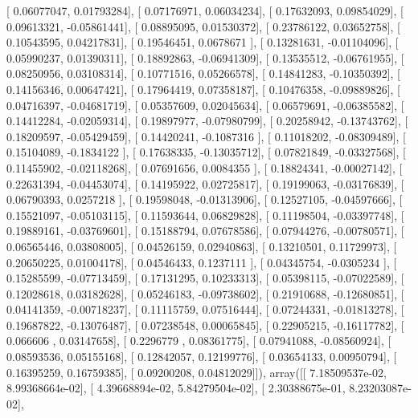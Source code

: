 \documentclass{article}
\begin{document}
       [ 0.06077047,  0.01793284],
       [ 0.07176971,  0.06034234],
       [ 0.17632093,  0.09854029],
       [ 0.09613321, -0.05861441],
       [ 0.08895095,  0.01530372],
       [ 0.23786122,  0.03652758],
       [ 0.10543595,  0.04217831],
       [ 0.19546451,  0.0678671 ],
       [ 0.13281631, -0.01104096],
       [ 0.05990237,  0.01390311],
       [ 0.18892863, -0.06941309],
       [ 0.13535512, -0.06761955],
       [ 0.08250956,  0.03108314],
       [ 0.10771516,  0.05266578],
       [ 0.14841283, -0.10350392],
       [ 0.14156346,  0.00647421],
       [ 0.17964419,  0.07358187],
       [ 0.10476358, -0.09889826],
       [ 0.04716397, -0.04681719],
       [ 0.05357609,  0.02045634],
       [ 0.06579691, -0.06385582],
       [ 0.14412284, -0.02059314],
       [ 0.19897977, -0.07980799],
       [ 0.20258942, -0.13743762],
       [ 0.18209597, -0.05429459],
       [ 0.14420241, -0.1087316 ],
       [ 0.11018202, -0.08309489],
       [ 0.15104089, -0.1834122 ],
       [ 0.17638335, -0.13035712],
       [ 0.07821849, -0.03327568],
       [ 0.11455902, -0.02118268],
       [ 0.07691656,  0.0084355 ],
       [ 0.18824341, -0.00027142],
       [ 0.22631394, -0.04453074],
       [ 0.14195922,  0.02725817],
       [ 0.19199063, -0.03176839],
       [ 0.06790393,  0.0257218 ],
       [ 0.19598048, -0.01313906],
       [ 0.12527105, -0.04597666],
       [ 0.15521097, -0.05103115],
       [ 0.11593644,  0.06829828],
       [ 0.11198504, -0.03397748],
       [ 0.19889161, -0.03769601],
       [ 0.15188794,  0.07678586],
       [ 0.07944276, -0.00780571],
       [ 0.06565446,  0.03808005],
       [ 0.04526159,  0.02940863],
       [ 0.13210501,  0.11729973],
       [ 0.20650225,  0.01004178],
       [ 0.04546433,  0.1237111 ],
       [ 0.04345754, -0.0305234 ],
       [ 0.15285599, -0.07713459],
       [ 0.17131295,  0.10233313],
       [ 0.05398115, -0.07022589],
       [ 0.12028618,  0.03182628],
       [ 0.05246183, -0.09738602],
       [ 0.21910688, -0.12680851],
       [ 0.04141359, -0.00718237],
       [ 0.11115759,  0.07516444],
       [ 0.07244331, -0.01813278],
       [ 0.19687822, -0.13076487],
       [ 0.07238548,  0.00065845],
       [ 0.22905215, -0.16117782],
       [ 0.066606  ,  0.03147658],
       [ 0.2296779 ,  0.08361775],
       [ 0.07941088, -0.08560924],
       [ 0.08593536,  0.05155168],
       [ 0.12842057,  0.12199776],
       [ 0.03654133,  0.00950794],
       [ 0.16395259,  0.16759385],
       [ 0.09200208,  0.04812029]]), array([[  7.18509537e-02,   8.99368664e-02],
       [  4.39668894e-02,   5.84279504e-02],
       [  2.30388675e-01,   8.23203087e-02],
\end{document}
